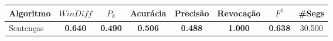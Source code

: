\documentclass{article}
\begin{document}
\newpage
\begin{longtable}[c]{|l|c|c|c|c|c|c|c|} 
\hline 
Algoritmo & $WinDiff$ & $P_k$ & Acurácia & Precisão & Revocação & $F^1$ & \#Segs\\ \hline 
Sentenças & \cellcolor{gray!20} \textbf{0.640} & \cellcolor{gray!20} \textbf{0.490} & \cellcolor{gray!20} \textbf{0.506} & \cellcolor{gray!20} \textbf{0.488} & \cellcolor{gray!20} \textbf{1.000} & \cellcolor{gray!20} \textbf{0.638} & 30.500  \\ \hline 
 \end{longtable} 
\newpage
\end{document}
